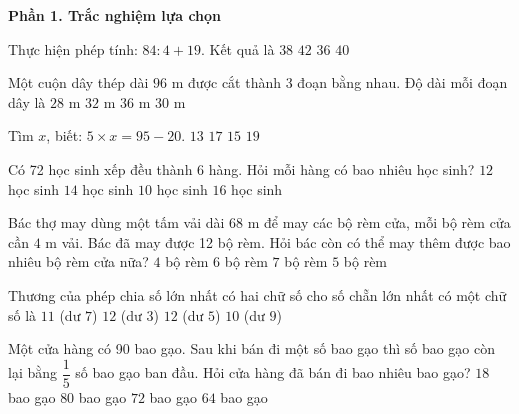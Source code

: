 \textbf{Phần 1. Trắc nghiệm lựa chọn}

\begin{ex} %
Thực hiện phép tính: $84 : 4 + 19$. Kết quả là
\choice
{$38$}
{$42$}
{$36$}
{\True $40$}
\end{ex}

\begin{ex} %
Một cuộn dây thép dài $96\text{ m}$ được cắt thành 3 đoạn bằng nhau. Độ dài mỗi đoạn dây là
\choice
{$28\text{ m}$}
{\True $32\text{ m}$}
{$36\text{ m}$}
{$30\text{ m}$}
\end{ex}

\begin{ex} %
Tìm $x$, biết: $5 \times x = 95 - 20$.
\choice
{$13$}
{$17$}
{\True $15$}
{$19$}
\end{ex}

\begin{ex} %
Có 72 học sinh xếp đều thành 6 hàng. Hỏi mỗi hàng có bao nhiêu học sinh?
\choice
{\True $12$ học sinh}
{$14$ học sinh}
{$10$ học sinh}
{$16$ học sinh}
\end{ex}

\begin{ex} %
Bác thợ may dùng một tấm vải dài $68\text{ m}$ để may các bộ rèm cửa, mỗi bộ rèm cửa cần $4\text{ m}$ vải. Bác đã may được 12 bộ rèm. Hỏi bác còn có thể may thêm được bao nhiêu bộ rèm cửa nữa?
\choice
{$4$ bộ rèm}
{$6$ bộ rèm}
{$7$ bộ rèm}
{\True $5$ bộ rèm}
\end{ex}

\begin{ex} %
Thương của phép chia số lớn nhất có hai chữ số cho số chẵn lớn nhất có một chữ số là
\choice
{$11$ (dư $7$)}
{\True $12$ (dư $3$)}
{$12$ (dư $5$)}
{$10$ (dư $9$)}
\end{ex}

\begin{ex} %
Một cửa hàng có 90 bao gạo. Sau khi bán đi một số bao gạo thì số bao gạo còn lại bằng $\dfrac{1}{5}$ số bao gạo ban đầu. Hỏi cửa hàng đã bán đi bao nhiêu bao gạo?
\choice
{$18$ bao gạo}
{$80$ bao gạo}
{\True $72$ bao gạo}
{$64$ bao gạo}
\end{ex}

